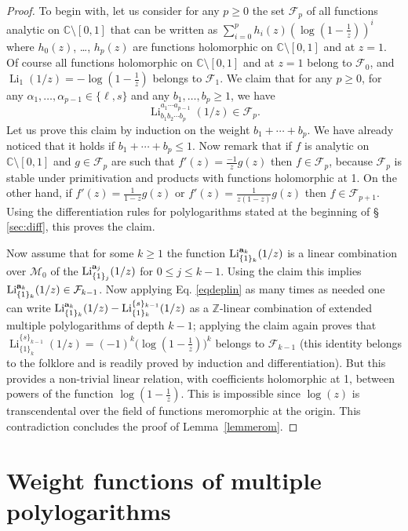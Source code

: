 \documentclass[reqno,12pt]{amsart}
\numberwithin{equation}{section}
\theoremstyle{remark}
\def\li{\operatorname{Li}}
\newcommand{\Z}{\mathbb{Z}}
\newcommand{\C}{\mathbb{C}}
\newcommand{\calF}{{\mathcal F}}
\newcommand{\mzero}{\mathcal{M}_0}
\begin{document}
\begin{proof}
To begin with, let us consider for any $p\geq 0$ the set $\calF_p$ of all functions 
analytic on $\C\setminus [0,1]$ that can be written as $\sum_{i=0}^p h_i(z) (\log(1-\frac1z))^i$ 
where $h_0(z)$, \ldots, $h_p(z)$ are functions holomorphic  on $\C\setminus [0,1]$ and at $z=1$. 
Of course all functions  holomorphic on $\C\setminus [0,1]$ and at $z=1$ belong to $\calF_0$, 
and $\li_1(1/z) = - \log(1-\frac1z)$ belongs to $\calF_1$. We claim that for any $p\geq 0$, 
for any $\alpha_1,\ldots,\alpha_{p-1} \in\{\ell,s\}$ and any $b_1,\ldots,b_p\geq 1$, we have
$$\li_{b_1b_2\cdots b_p}^{a_1 \cdots a_{p-1}}(1/z) \in\calF_p.$$
Let us prove this claim by induction on the weight $b_1+\cdots+b_p$. We have already noticed 
that it holds if $b_1+\cdots+b_p \leq 1$. Now remark that if $f$ is   analytic on $\C\setminus [0,1]$ 
and $g\in \calF_{p}$ are such that $f'(z) = \frac{-1}z g(z)$ then $f\in\calF_p$, because $\calF_p$ 
is stable under primitivation and products with functions holomorphic at 1. On the other hand, if 
 $f'(z) = \frac{1}{1-z} g(z)$ or $f'(z) = \frac{1}{z(1-z)} g(z)$ then $f\in\calF_{p+1}$. 
Using the differentiation rules for polylogarithms stated at the beginning of \S~ \ref{sec:diff}, this proves the claim.

\bigskip

Now assume that for some $k\geq 1$ the function $\li_{\{1\}_k}^{ {\bf a}_k}(1/z)$ is 
 a linear combination over $\mzero$ of the $\li_{\{1\}_j}^{ {\bf a}_j}(1/z)$ for $0\leq j \leq k-1$. 
Using the claim this implies $\li_{\{1\}_k}^{ {\bf a}_k}(1/z) \in \calF_{k-1}$. Now applying 
Eq. \eqref{eqdeplin} as many times as needed one can write 
$\li_{\{1\}_k}^{ {\bf a}_k}(1/z)-\li_{\{1\}_k}^{ \{s\}_{k-1}}(1/z)$ as a $\Z$-linear combination 
of extended multiple polylogarithms of depth $k-1$; applying 
the claim again proves that 
 $ \li_{\{1\}_k}^{ \{s\}_{k-1}}(1/z) = (-1)^{k} \big( \log(1-\frac1z)\big)^k$ 
belongs to $\calF_{k-1}$ (this identity belongs to the folklore and is readily proved 
by induction and differentiation). 
But this provides 
a non-trivial linear relation, with coefficients holomorphic at 1, between powers 
of the function $\log(1-\frac1z)$. This is impossible since $\log(z)$ is transcendental 
over the field of functions meromorphic at the origin. This contradiction 
concludes the proof of Lemma~\ref{lemmerom}. 
\end{proof}

\section{Weight functions of multiple polylogarithms}\label{sec:weight}
\end{document}
